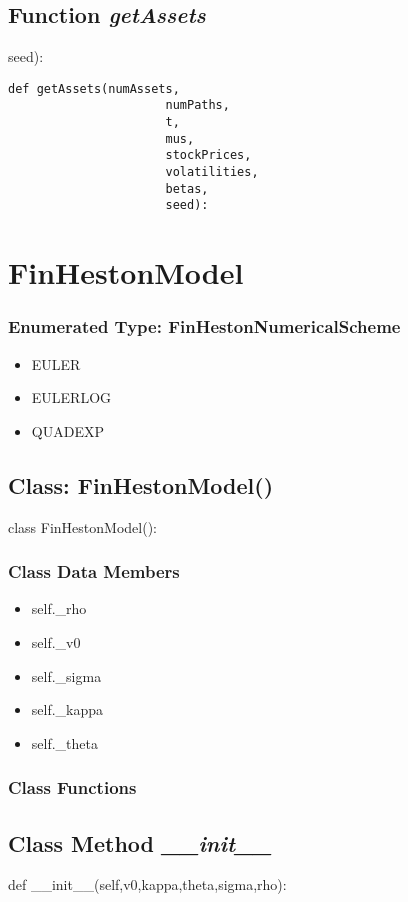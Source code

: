 \documentclass[twoside,11pt]{book}
\begin{document}
\subsection{Function {\it getAssets}}
seed):    

\begin{lstlisting}
def getAssets(numAssets,
                      numPaths,
                      t,
                      mus,
                      stockPrices,
                      volatilities,
                      betas,
                      seed):    
\end{lstlisting}

\newpage
\section{FinHestonModel}

\subsubsection{Enumerated Type: FinHestonNumericalScheme}
\begin{itemize}
\item{EULER}
\item{EULERLOG}
\item{QUADEXP}
\end{itemize}

\subsection{Class: FinHestonModel()}
class FinHestonModel():

\subsubsection{Class Data Members}
\begin{itemize}
\item{self.\_rho}
\item{self.\_v0}
\item{self.\_sigma}
\item{self.\_kappa}
\item{self.\_theta}
\end{itemize}

\subsubsection{Class Functions}

\subsection{Class Method {\it \_\_init\_\_}}
def \_\_init\_\_(self,v0,kappa,theta,sigma,rho):
\end{document}
